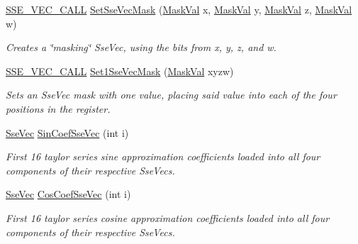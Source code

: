 \begin{DoxyCompactItemize}
\hyperlink{ssevec__math__defs_8h_a97454f977a5281455cecacce1e8ba670}{S\+S\+E\+\_\+\+V\+E\+C\+\_\+\+C\+A\+L\+L} \hyperlink{namespacegofxmath_a00fde6f7347c3610a9b6184079d6490e}{Set\+Sse\+Vec\+Mask} (\hyperlink{group___scalar_math_consts_gab1b391d7995f105a3340b15c6c9d0763}{Mask\+Val} x, \hyperlink{group___scalar_math_consts_gab1b391d7995f105a3340b15c6c9d0763}{Mask\+Val} y, \hyperlink{group___scalar_math_consts_gab1b391d7995f105a3340b15c6c9d0763}{Mask\+Val} z, \hyperlink{group___scalar_math_consts_gab1b391d7995f105a3340b15c6c9d0763}{Mask\+Val} w)
\begin{DoxyCompactList}\small\item\em Creates a \char`\"{}masking\char`\"{} Sse\+Vec, using the bits from x, y, z, and w. \end{DoxyCompactList}\item 
\hyperlink{ssevec__math__defs_8h_a97454f977a5281455cecacce1e8ba670}{S\+S\+E\+\_\+\+V\+E\+C\+\_\+\+C\+A\+L\+L} \hyperlink{namespacegofxmath_a2f592b6bcc06fdfaa561ed3f33ca0ed2}{Set1\+Sse\+Vec\+Mask} (\hyperlink{group___scalar_math_consts_gab1b391d7995f105a3340b15c6c9d0763}{Mask\+Val} xyzw)
\begin{DoxyCompactList}\small\item\em Sets an Sse\+Vec mask with one value, placing said value into each of the four positions in the register. \end{DoxyCompactList}\item 
\hypertarget{namespacegofxmath_ab1875506d992bc0db715915d6fade98c}{}\hyperlink{namespacegofxmath_a634570ddcd2496053ee966227080e02f}{Sse\+Vec} \hyperlink{namespacegofxmath_ab1875506d992bc0db715915d6fade98c}{Sin\+Coef\+Sse\+Vec} (int i)\label{namespacegofxmath_ab1875506d992bc0db715915d6fade98c}

\begin{DoxyCompactList}\small\item\em First 16 taylor series sine approximation coefficients loaded into all four components of their respective Sse\+Vecs. \end{DoxyCompactList}\item 
\hypertarget{namespacegofxmath_a17160d92d915e28c97837f75754401d0}{}\hyperlink{namespacegofxmath_a634570ddcd2496053ee966227080e02f}{Sse\+Vec} \hyperlink{namespacegofxmath_a17160d92d915e28c97837f75754401d0}{Cos\+Coef\+Sse\+Vec} (int i)\label{namespacegofxmath_a17160d92d915e28c97837f75754401d0}

\begin{DoxyCompactList}\small\item\em First 16 taylor series cosine approximation coefficients loaded into all four components of their respective Sse\+Vecs. \end{DoxyCompactList}\end{DoxyCompactItemize}


